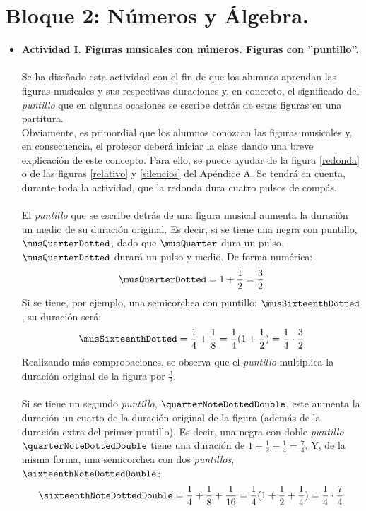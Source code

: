 \documentclass[a4paper, openright, 11pt, titlepage]{report}
\theoremstyle{definition}\newtheorem{defin}[propo]{Definition}
\theoremstyle{definition}\newtheorem{obser}[propo]{Remark}
\theoremstyle{definition}\newtheorem{ejem}[propo]{Ejemplo}
\theoremstyle{definition}\newtheorem{algoritmo}[propo]{Algoritmo}
\begin{document}
\section{Bloque 2: Números y Álgebra.}
\begin{itemize}
    \item \textbf{Actividad I. Figuras musicales con números. Figuras con ''puntillo''.}\\\\
    Se ha diseñado esta actividad con el fin de que los alumnos aprendan las figuras musicales y sus respectivas duraciones y, en concreto, el significado del \textit{puntillo} que en algunas ocasiones se escribe detrás de estas figuras en una partitura.\\
   Obviamente, es primordial que los alumnos conozcan las figuras musicales y, en consecuencia, el profesor deberá iniciar la clase dando una breve explicación de este concepto. Para ello, se puede ayudar de la figura \ref{redonda} o de las figuras \ref{relativo} y \ref{silencios} del Apéndice A. Se tendrá en cuenta, durante toda la actividad, que la redonda dura cuatro pulsos de compás.\\\\
    El \textit{puntillo} que se escribe detrás de una figura musical aumenta la duración un medio de su duración original. Es decir, si se tiene una negra con puntillo, $\musQuarterDotted$, dado que $\musQuarter$ dura un pulso, $\musQuarterDotted$ durará un pulso y medio. De forma numérica: $$\musQuarterDotted = 1 + \frac{1}{2} = \frac{3}{2}$$
    Si se tiene, por ejemplo, una semicorchea con puntillo: $\musSixteenthDotted$, su duración será: $$\musSixteenthDotted = \frac{1}{4} + \frac{1}{8} = \frac{1}{4}(1 + \frac{1}{2}) = \frac{1}{4}\cdot\frac{3}{2}$$
    Realizando más comprobaciones, se observa que el \textit{puntillo} multiplica la duración original de la figura por $\frac{3}{2}$.\\\\
    Si se tiene un segundo \textit{puntillo}, $\quarterNoteDottedDouble$, este aumenta la duración un cuarto de la duración original de la figura (además de la duración extra del primer puntillo). Es decir, una negra con doble \textit{puntillo} $\quarterNoteDottedDouble$ tiene una duración de $1 + \frac{1}{2} + \frac{1}{4} = \boxed{\frac{7}{4}}$. Y, de la misma forma, una semicorchea con dos \textit{puntillos}, $\sixteenthNoteDottedDouble$: $$\sixteenthNoteDottedDouble = \frac{1}{4} + \frac{1}{8} + \frac{1}{16} = \frac{1}{4}(1+\frac{1}{2} + \frac{1}{4}) = \frac{1}{4}\cdot\frac{7}{4}$$

\end{itemize}
\end{document}
